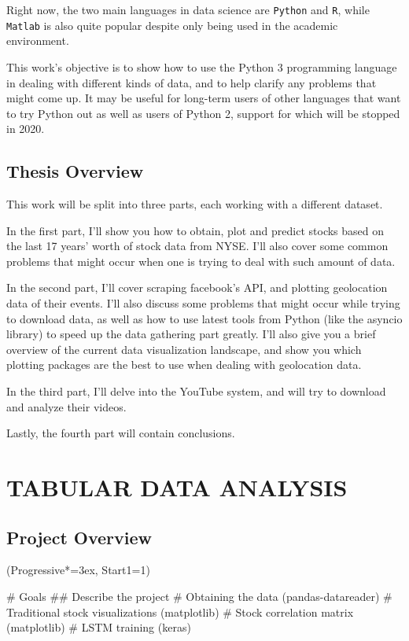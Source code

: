 \documentclass[12pt, a4paper]{article}
\let\OldEasylist\easylist
\let\OldEndEasylist\endeasylist
\renewenvironment{easylist}{%
    \OldEasylist%
    \ListProperties(Progressive*=3ex, Start1=1)%
}{%
    \OldEndEasylist%
}%
\begin{document}
Right now, the two main languages in data science are \texttt{Python} and \texttt{R}, while \texttt{Matlab} is also quite popular despite only being used in the academic environment.

This work's objective is to show how to use the Python 3 programming language in dealing with different kinds of data, and to help clarify any problems that might come up. It may be useful for long-term users of other languages that want to try Python out as well as users of Python 2, support for which will be stopped in 2020.
\subsection{Thesis Overview}
This work will be split into three parts, each working with a different dataset.

In the first part, I'll show you how to obtain, plot and predict stocks based on the last 17 years' worth of stock data from NYSE\footnotemark. I'll also cover some common problems that might occur when one is trying to deal with such amount of data.

In the second part, I'll cover scraping facebook's API, and plotting geolocation data of their events. I'll also discuss some problems that might occur while trying to download data, as well as how to use latest tools from Python (like the asyncio library) to speed up the data gathering part greatly. I'll also give you a brief overview of the current data visualization landscape, and show you which plotting packages are the best to use when dealing with geolocation data.

In the third part, I'll delve into the YouTube system, and will try to download and analyze their videos.

Lastly, the fourth part will contain conclusions.

\newpage
\section{TABULAR DATA ANALYSIS}
\subsection{Project Overview}
\begin{easylist}
# Goals
## Describe the project
# Obtaining the data (pandas-datareader)
# Traditional stock visualizations (matplotlib)
# Stock correlation matrix (matplotlib)
# LSTM training (keras)
\end{easylist}
\end{document}
